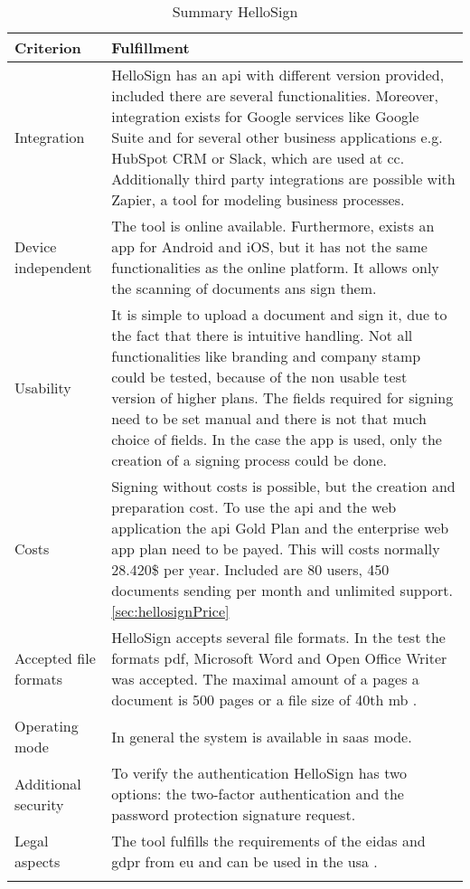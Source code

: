 	\begin{longtable}{|p{4cm}|p{10cm}|} \hline
		Criterion & Fulfillment \\ \hline
		Integration & HelloSign has an \gls{api} with different version provided, included there are several functionalities. Moreover, integration exists for Google services like Google Suite and for several other business applications e.g. HubSpot CRM or Slack, which are used at \gls{cc}. Additionally third party integrations are possible with Zapier, a tool for modeling business processes. \parencite{hellosign2018integration,hellosign2018api}\\ \hline
		Device independent & The tool is online available. Furthermore, exists an \gls{app} for Android and iOS, but it has not the same functionalities as the online platform. It allows only the scanning of documents ans sign them. \parencite{hellosign2018legal}\\ \hline
		Usability & It is simple to upload a document and sign it, due to the fact that there is intuitive handling. Not all functionalities like branding and company stamp could be tested, because of the non usable test version of higher plans. The fields required for signing need to be set manual and there is not that much choice of fields. In the case the \gls{app} is used, only the creation of a signing process could be done.\\ \hline
		Costs &  Signing without costs is possible, but the creation and preparation cost. To use the \gls{api} and the web application the \gls{api} Gold Plan and the enterprise web app plan need to be payed. This will costs normally 28.420\$ per year. Included are 80 users, 450 documents sending per month and unlimited support. \ref{sec:hellosignPrice} \\ \hline
		Accepted file formats & HelloSign accepts several file formats. In the test the formats \gls{pdf}, Microsoft Word and Open Office Writer was accepted. The maximal amount of a pages a document is 500 pages or a file size of 40th \gls{mb} \parencite{hellosign2018documents}.\\ \hline
		Operating mode & In general the system is available in \gls{saas} mode. \parencite{hellosign2018features} \\ \hline
		Additional security & To verify the authentication HelloSign has two options: the two-factor authentication and the password protection signature request.\parencite{hellosign2018security} \\ \hline
		Legal aspects & The tool fulfills the requirements of the \gls{eidas} and \gls{gdpr} from \gls{eu} and can be used in the \gls{usa} \parencite{hellosign2018legal,hellosign2018compliance}. \\ \hline
	\caption{Summary HelloSign}
	\label{tab:hellosign}
	\end{longtable}

